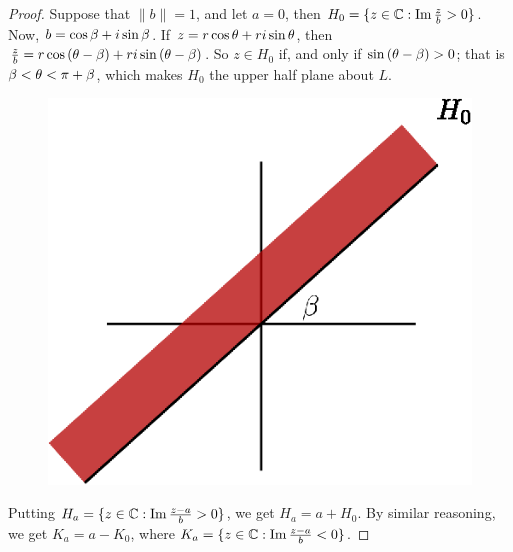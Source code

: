 \begin{proof}
    Suppose that $\|b\|=1$, and let  $a=0$, then  $H_0=\{z \in \mathbb{C} :
    \operatorname{Im}{\frac{z}{b}} > 0\}$. Now, $b=\cos{\beta}+i\sin{\beta}$. If
    $z=r\cos{\theta}+ri\sin{\theta}$, then
    $\frac{z}{b}=r\cos{(\theta-\beta)}+ri\sin{(\theta-\beta)}$. So $z \in H_0$ if, and only
    if $\sin{(\theta-\beta)}>0$; that is $\beta<\theta<\pi+\beta$, which makes  $H_0$ the upper
    half plane about $L$.
     \begin{figure}[h]
        \centering
        \includegraphics[scale=1]{Figures/Chapter1/H_0.eps}
        \caption{}
        \label{}
    \end{figure}

    Putting $H_a=\{z \in \mathbb{C} : \operatorname{Im}{\frac{z-a}{b}}>0\}$, we get $H_a=a+H_0$. By
    similar reasoning, we get $K_a=a-K_0$, where $K_a=\{z \in \mathbb{C} :
    \operatorname{Im}{\frac{z-a}{b}}<0\}$.
\end{proof}
